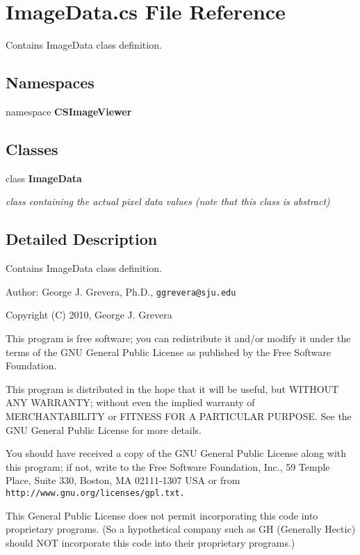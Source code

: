 \section{Image\-Data.cs File Reference}
\label{_image_data_8cs}
Contains Image\-Data class definition. 

\subsection*{Namespaces}
\begin{CompactItemize}
\item 
namespace {\bf CSImage\-Viewer}
\end{CompactItemize}
\subsection*{Classes}
\begin{CompactItemize}
\item 
class {\bf Image\-Data}
\begin{CompactList}\small\item\em class containing the actual pixel data values (note that this class is abstract) \item\end{CompactList}\end{CompactItemize}


\subsection{Detailed Description}
Contains Image\-Data class definition. 

\begin{Desc}
\item[Author:]George J. Grevera, Ph.D., {\tt ggrevera@sju.edu}\end{Desc}
Copyright (C) 2010, George J. Grevera

This program is free software; you can redistribute it and/or modify it under the terms of the GNU General Public License as published by the Free Software Foundation.

This program is distributed in the hope that it will be useful, but WITHOUT ANY WARRANTY; without even the implied warranty of MERCHANTABILITY or FITNESS FOR A PARTICULAR PURPOSE. See the GNU General Public License for more details.

You should have received a copy of the GNU General Public License along with this program; if not, write to the Free Software Foundation, Inc., 59 Temple Place, Suite 330, Boston, MA 02111-1307 USA or from {\tt http://www.gnu.org/licenses/gpl.txt.}

This General Public License does not permit incorporating this code into proprietary programs. (So a hypothetical company such as GH (Generally Hectic) should NOT incorporate this code into their proprietary programs.) 